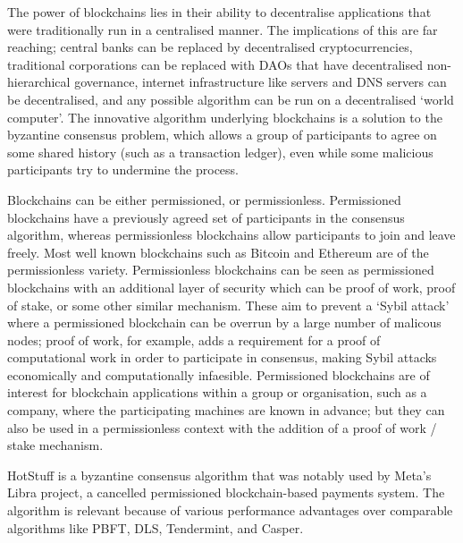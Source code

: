 

The power of blockchains lies in their ability to decentralise applications that were traditionally run in a centralised manner. The implications of this are far reaching; central banks can be replaced by decentralised cryptocurrencies, traditional corporations can be replaced with DAOs that have decentralised non-hierarchical governance, internet infrastructure like servers and DNS servers can be decentralised, and any possible algorithm can be run on a decentralised `world computer'. The innovative algorithm underlying blockchains is a solution to the byzantine consensus problem, which allows a group of participants to agree on some shared history (such as a transaction ledger), even while some malicious participants try to undermine the process.

Blockchains can be either permissioned, or permissionless. Permissioned blockchains have a previously agreed set of participants in the consensus algorithm, whereas permissionless blockchains allow participants to join and leave freely. Most well known blockchains such as Bitcoin and Ethereum are of the permissionless variety. Permissionless blockchains can be seen as permissioned blockchains with an additional layer of security which can be proof of work, proof of stake, or some other similar mechanism. These aim to prevent a `Sybil attack' where a permissioned blockchain can be overrun by a large number of malicous nodes; proof of work, for example, adds a requirement for a proof of computational work in order to participate in consensus, making Sybil attacks economically and computationally infaesible. Permissioned blockchains are of interest for blockchain applications within a group or organisation, such as a company, where the participating machines are known in advance; but they can also be used in a permissionless context with the addition of a proof of work / stake mechanism.

HotStuff is a byzantine consensus algorithm that was notably used by Meta's Libra project, a cancelled permissioned blockchain-based payments system. The algorithm is relevant because of various performance advantages over comparable algorithms like PBFT, DLS, Tendermint, and Casper.

